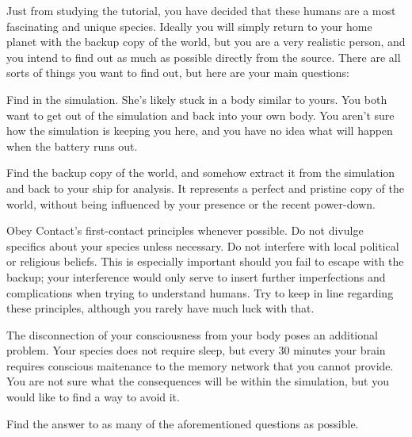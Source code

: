 \documentclass[char]{guildcamp1}
\begin{document}
Just from studying the tutorial, you have decided that these humans are a most fascinating and unique species. Ideally you will simply return to your home planet with the backup copy of the world, but you are a very realistic person, and you intend to find out as much as possible directly from the source. There are all sorts of things you want to find out, but here are your main questions:



\begin{itemz}[Goals]
  \item Find \cActive{\they} in the simulation. She's likely stuck in a body similar to yours. You both want to get out of the simulation and back into your own body. You aren't sure how the simulation is keeping you here, and you have no idea what will happen when the battery runs out.
  \item Find the backup copy of the world, and somehow extract it from the simulation and back to your ship for analysis. It represents a perfect and pristine copy of the world, without being influenced by your presence or the recent power-down.
  \item Obey Contact's first-contact principles whenever possible. Do not divulge specifics about your species unless necessary. Do not interfere with local political or religious beliefs. This is especially important should you fail to escape with the backup; your interference would only serve to insert further imperfections and complications when trying to understand humans. Try to keep \cActive{\they} in line regarding these principles, although you rarely have much luck with that.
  \item The disconnection of your consciousness from your body poses an additional problem. Your species does not require sleep, but every 30 minutes your brain requires conscious maitenance to the memory network that you cannot provide. You are not sure what the consequences will be within the simulation, but you would like to find a way to avoid it.
  \item Find the answer to as many of the aforementioned questions as possible.
  
\end{itemz}

\begin{contacts}
  \contact{\cActive{}} 
\end{contacts}
\end{document}
